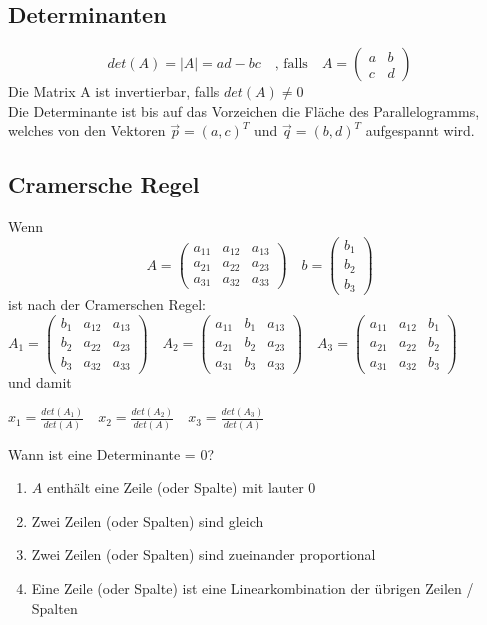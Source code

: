 \documentclass{report}
\begin{document}
\subsection{Determinanten}
\begin{equation}det(A) = |A| = ad-bc \quad \mbox{, falls} \quad A = \left(\begin{matrix}a & b\\c & d\end{matrix}\right) \end{equation}
Die Matrix A ist invertierbar, falls $det(A) \neq 0$\\
Die Determinante ist bis auf das Vorzeichen die Fläche des Parallelogramms, welches von den Vektoren $\vec{p} = (a,c)^T$ und $\vec{q} = (b,d)^T$ aufgespannt wird.
\subsection{Cramersche Regel}
Wenn
\begin{equation}A=\left(\begin{matrix}a_{11} & a_{12} & a_{13}\\a_{21} & a_{22} & a_{23}\\a_{31} & a_{32} & a_{33}\end{matrix}\right) \quad b = \left(\begin{matrix}b_1\\b_2\\b_3\end{matrix}\right)\end{equation}
ist nach der Cramerschen Regel:\\
$A_1=\left(\begin{matrix}b_1 & a_{12} & a_{13}\\b_2 & a_{22} & a_{23}\\b_3 & a_{32} & a_{33}\end{matrix}\right) \quad A_2=\left(\begin{matrix}a_{11} & b_1 & a_{13}\\a_{21} & b_2 & a_{23}\\a_{31} & b_3 & a_{33}\end{matrix}\right) \quad A_3=\left(\begin{matrix}a_{11} & a_{12} & b_1\\a_{21} & a_{22} & b_2\\a_{31} & a_{32} & b_3\end{matrix}\right)$\\
und damit
\begin{center}
$x_1 = \frac{det(A_1)}{det(A)} \quad x_2 = \frac{det(A_2)}{det(A)} \quad x_3 = \frac{det(A_3)}{det(A)}$
\end{center}
Wann ist eine Determinante = 0?
\begin{enumerate}
\item $A$ enthält eine Zeile (oder Spalte) mit lauter 0
\item Zwei Zeilen (oder Spalten) sind gleich
\item Zwei Zeilen (oder Spalten) sind zueinander proportional
\item Eine Zeile (oder Spalte) ist eine Linearkombination der übrigen Zeilen / Spalten\end{enumerate}
\end{document}
